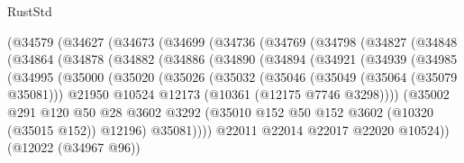 \begin{lexlean}{RustStd}
\begin{coremodule}
          (@34579
            (@34627
              (@34673
                (@34699
                  (@34736
                    (@34769
                      (@34798
                        (@34827
                          (@34848
                            (@34864
                              (@34878
                                (@34882
                                  (@34886
                                    (@34890
                                      (@34894
                                        (@34921
                                          (@34939
                                            (@34985
                                              (@34995
                                                (@35000
                                                  (@35020
                                                    (@35026
                                                      (@35032
                                                        (@35046
                                                          (@35049 (@35064 (@35079 @35081)))
                                                          @21950
                                                          @10524
                                                          @12173
                                                          (@10361 (@12175 @7746 @3298))))
                                                      (@35002
                                                        @291
                                                        @120
                                                        @50
                                                        @28
                                                        @3602
                                                        @3292
                                                        (@35010
                                                          @152
                                                          @50
                                                          @152
                                                          @3602
                                                          (@10320 (@35015 @152))
                                                          @12196)
                                                        @35081))))
                                                @22011
                                                @22014
                                                @22017
                                                @22020
                                                @10524))
                                            (@12022 (@34967 @96))

\end{coremodule}
\end{lexlean}

